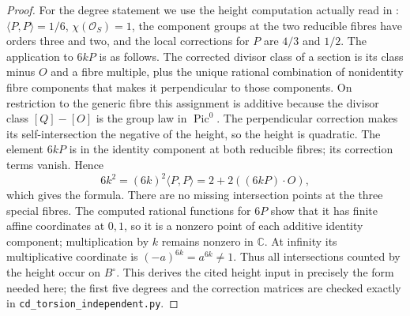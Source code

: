 \begin{proof}
For the degree statement we use the height computation actually read in
\cite[Lemma 2.1 and proof]{E26}: \(\langle P,P\rangle=1/6\),
\(\chi(\mathcal O_S)=1\), the component groups at the two reducible fibres
have orders three and two, and the local corrections for \(P\) are
\(4/3\) and \(1/2\). The application to \(6kP\) is as follows.
The corrected divisor class of a section is its class minus \(O\) and
a fibre multiple, plus the unique rational combination of nonidentity
fibre components that makes it perpendicular to those components.
On restriction to the generic fibre this assignment is additive because
the divisor class \([Q]-[O]\) is the group law in \(\operatorname{Pic}^0\).
The perpendicular correction makes its self-intersection the negative of
the height, so the height is quadratic. The element \(6kP\) is in the
identity component at both reducible fibres; its correction terms vanish.
Hence
\[
 6k^2=(6k)^2\langle P,P\rangle
 =2+2((6kP)\mathbin{\cdot}O),
\]
which gives the formula. There are no missing intersection points at the
three special fibres. The computed rational functions for \(6P\) show
that it has finite affine coordinates at \(0,1\), so it is a nonzero point
of each additive identity component; multiplication by \(k\) remains
nonzero in \(\mathbb C\). At infinity its multiplicative coordinate is
\((-a)^{6k}=a^{6k}\ne1\). Thus all intersections counted by the height
occur on \(B^\circ\). This derives the cited height input in precisely
the form needed here; the first five degrees and the correction matrices
are checked exactly in \texttt{cd\_torsion\_independent.py}.
\end{proof}


